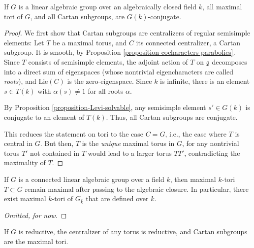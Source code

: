 \begin{theorem}
\label{theorem-Cartan-tori-conjugate}
If $G$ is a linear algebraic group over an algebraically closed field $k$, all maximal tori of $G$, and all Cartan subgroups, are $G(k)$-conjugate.
\end{theorem}


\begin{proof}
We first show that Cartan subgroups are centralizers of regular semisimple elements: Let $T$ be a maximal torus, and $C$ its connected centralizer, a Cartan subgroup. It is smooth, by Proposition \ref{proposition-cocharacters-parabolics}. Since $T$ consists of semisimple elements, the adjoint action of $T$ on $\mathfrak g$ decomposes into a direct sum of eigenspaces (whose nontrivial eigencharacters are called \emph{roots}), and $\text{Lie}(C)$ is the zero-eigenspace. Since $k$ is infinite, there is an element $s\in T(k)$ with $\alpha(s)\ne 1$ for all roots $\alpha$. 

By Proposition \ref{proposition-Levi-solvable}, any semisimple element $s'\in G(k)$ is conjugate to an element of $T(k)$. Thus, all Cartan subgroups are conjugate. 

This reduces the statement on tori to the case $C=G$, i.e., the case where $T$ is central in $G$. But then, $T$ is the \emph{unique} maximal torus in $G$, for any nontrivial torus $T'$ not contained in $T$ would lead to a larger torus $TT'$, contradicting the maximality of $T$.
\end{proof}





\begin{theorem}
\label{theorem-maximal-tori-exist}
If $G$ is a connected linear algebraic group over a field $k$, then maximal $k$-tori $T\subset G$ remain maximal after passing to the algebraic closure. In particular, there exist maximal $k$-tori of $G_{\bar k}$ that are defined over $k$.
\end{theorem}

\begin{proof}
 [Omitted, for now]
\end{proof}




\begin{proposition}
\label{proposition-Cartan-reductive}
If $G$ is reductive, the centralizer of any torus is reductive, and Cartan subgroups are the maximal tori. 
\end{proposition}

